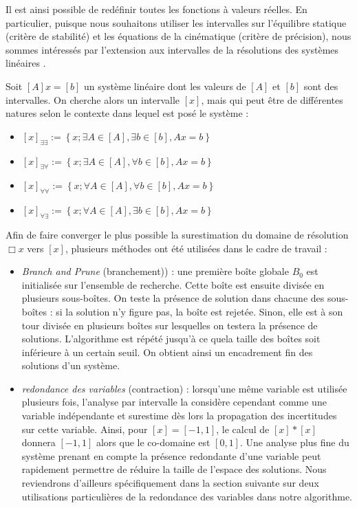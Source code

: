 Il est ainsi possible de red\'efinir toutes les fonctions \`a valeurs 
r\'eelles. En particulier, puisque nous souhaitons utiliser les intervalles 
sur l'\'equilibre statique (crit\`ere de stabilit\'e) et les \'equations de la 
cin\'ematique (crit\`ere de pr\'ecision), nous sommes int\'eress\'es par 
l'extension aux intervalles de la r\'esolutions des syst\`emes lin\'eaires 
\cite{hansen1980}.

Soit $[A]x = [b]$ un syst\`eme lin\'eaire dont les valeurs de $[A]$ et $[b]$ 
sont des intervalles. On cherche alors un intervalle $[x]$, mais 
qui peut \^etre de diff\'erentes natures selon le contexte dans lequel est 
pos\'e le syst\`eme :
\begin{itemize}
 \item $[x]_{\exists \exists} := \left \lbrace x ; \exists A \in [A], \exists b 
\in [b], Ax = b \right \rbrace$
 \item $[x]_{\exists \forall} := \left \lbrace x ; \exists A \in [A], \forall b 
\in [b], Ax = b \right \rbrace$
 \item $[x]_{\forall \forall} := \left \lbrace x ; \forall A \in [A], \forall b 
\in [b], Ax = b \right \rbrace$
 \item $[x]_{\forall \exists} := \left \lbrace x ; \forall A \in [A], \exists b 
\in [b], Ax = b \right \rbrace $
\end{itemize}

Afin de faire converger le plus possible la surestimation du domaine de 
r\'esolution $\Box x$ vers $[x]$, plusieurs m\'ethodes ont \'et\'e utilis\'ees 
dans le cadre de travail :
\begin{itemize}
 \item {\it Branch and Prune} (branchement)) : une premi\`ere bo\^ite globale 
$B_0$ est initialis\'ee sur l'ensemble de recherche. Cette bo\^ite est ensuite 
divis\'ee en plusieurs sous-bo\^ites. On teste la pr\'esence de solution dans 
chacune des sous-bo\^ites : si la solution n'y figure pas, la bo\^ite est 
rejet\'ee. Sinon, elle est \`a son tour divis\'ee en plusieurs bo\^ites sur 
lesquelles on testera la pr\'esence de solutions. L'algorithme est r\'ep\'et\'e 
jusqu'\`a ce quela taille des bo\^ites soit inf\'erieure \`a un certain seuil. 
On obtient ainsi un encadrement fin des solutions d'un syst\`eme.
  \item {\it redondance des variables} (contraction) : lorsqu'une m\^eme 
variable est utilis\'ee plusieurs fois, l'analyse par intervalle la consid\`ere 
cependant comme une variable ind\'ependante et surestime d\`es lors la 
propagation des incertitudes sur cette variable. Ainsi, pour $[x] = [-1,1]$, le 
calcul de $[x]*[x]$ donnera $[-1,1]$ alors que le co-domaine est $[0,1]$. 
Une analyse plus fine du syst\`eme prenant en compte la pr\'esence 
redondante d'une variable peut rapidement permettre de r\'eduire la taille 
de l'espace des solutions. Nous reviendrons d'ailleurs sp\'ecifiquement dans la 
section suivante sur deux utilisations particuli\`eres de la redondance des 
variables dans notre algorithme.  
\end{itemize}

